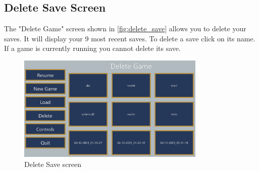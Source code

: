 \subsection{Delete Save Screen}
The "Delete Game" screen shown in \autoref{fig:delete_save} allows you to delete your saves.
It will display your 9 most recent saves.
To delete a save click on its name.
If a game is currently running you cannot delete its save.

\begin{figure}[H]
    \centering
    \includegraphics[width=0.8\textwidth]{sections/user_manual/resources/delete-game.png}
    \caption{Delete Save screen}
    \label{fig:delete_save}
\end{figure}